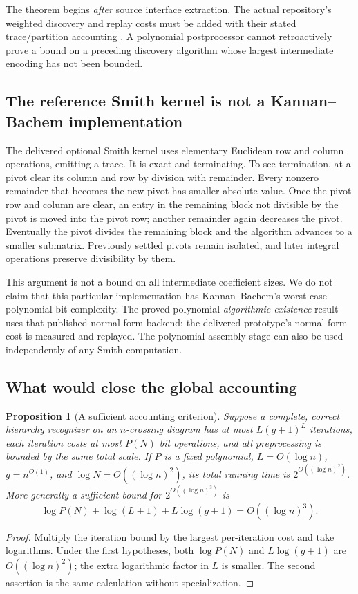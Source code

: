 \documentclass[11pt]{article}
\newtheorem{proposition}[theorem]{Proposition}
\theoremstyle{definition}
\theoremstyle{remark}
\begin{document}
The theorem begins \emph{after} source interface extraction. The actual
repository's weighted discovery and replay costs must be added with their
stated trace/partition accounting \cite{repo-parallelity}. A polynomial
postprocessor cannot retroactively prove a bound on a preceding discovery
algorithm whose largest intermediate encoding has not been bounded.

\subsection{The reference Smith kernel is not a Kannan--Bachem implementation}
The delivered optional Smith kernel uses elementary Euclidean row and column
operations, emitting a trace. It is exact and terminating. To see
termination, at a pivot clear its column and row by division with remainder.
Every nonzero remainder that becomes the new pivot has smaller absolute
value. Once the pivot row and column are clear, an entry in the remaining
block not divisible by the pivot is moved into the pivot row; another
remainder again decreases the pivot. Eventually the pivot divides the
remaining block and the algorithm advances to a smaller submatrix.
Previously settled pivots remain isolated, and later integral operations
preserve divisibility by them.

This argument is not a bound on all intermediate coefficient sizes. We do
not claim that this particular implementation has Kannan--Bachem's worst-case
polynomial bit complexity. The proved polynomial \emph{algorithmic existence}
result uses that published normal-form backend; the delivered prototype's
normal-form cost is measured and replayed. The polynomial assembly stage
can also be used independently of any Smith computation.

\subsection{What would close the global accounting}
\begin{proposition}[A sufficient accounting criterion]
\label{prop:qp}
Suppose a complete, correct hierarchy recognizer on an $n$-crossing diagram
has at most $L(g+1)^L$ iterations, each iteration costs at most $P(N)$ bit
operations, and all preprocessing is bounded by the same total scale.
If $P$ is a fixed polynomial, $L=O(\log n)$, $g=n^{O(1)}$, and
$\log N=O((\log n)^2)$, its total running time is
$2^{O((\log n)^2)}$. More generally a sufficient bound for
$2^{O((\log n)^3)}$ is
\[
 \log P(N)+\log(L+1)+L\log(g+1)=O((\log n)^3).
\]
\end{proposition}
\begin{proof}
Multiply the iteration bound by the largest per-iteration cost and take
logarithms. Under the first hypotheses, both $\log P(N)$ and
$L\log(g+1)$ are $O((\log n)^2)$; the extra logarithmic factor in $L$ is
smaller. The second assertion is the same calculation without specialization.
\end{proof}
\end{document}
